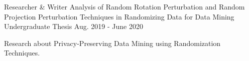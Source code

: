 

\begin{cventries}

  \cventry
    {Researcher \& Writer} %
    {Analysis of Random Rotation Perturbation and Random Projection Perturbation Techniques in Randomizing Data for Data Mining} %
    {Undergraduate Thesis} %
    {Aug. 2019 - June 2020} %
    {
      \begin{cvitems} %
        \item {Research about Privacy-Preserving Data Mining using Randomization Techniques.}
      \end{cvitems}
    }

\end{cventries}
